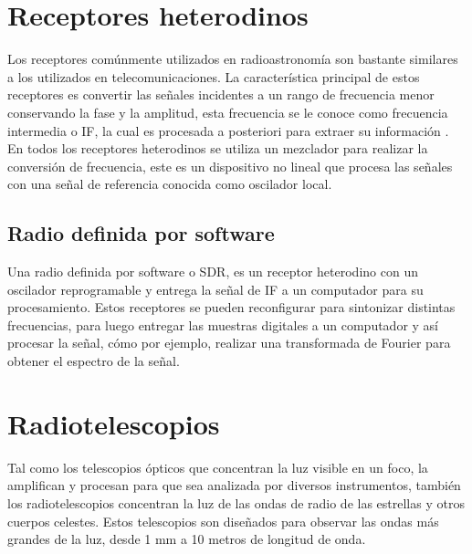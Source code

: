 \section{Receptores heterodinos}

Los receptores comúnmente utilizados en radioastronomía son bastante similares a los utilizados en telecomunicaciones. La característica principal de estos receptores es convertir las señales incidentes a un rango de frecuencia menor conservando la fase y la amplitud, esta frecuencia se le conoce como frecuencia intermedia o IF, la cual es procesada a posteriori para extraer su información \cite{Finger2013}.\\

En todos los receptores heterodinos se utiliza un mezclador para realizar la conversión de frecuencia, este es un dispositivo no lineal que procesa las señales con una señal de referencia conocida como oscilador local.\\


\subsection{Radio definida por software}

Una radio definida por software o SDR, es un receptor heterodino con un oscilador reprogramable y entrega la señal de IF a un computador para su procesamiento. Estos receptores se pueden reconfigurar para sintonizar distintas frecuencias, para luego entregar las muestras digitales a un computador y así procesar la señal, cómo por ejemplo, realizar una transformada de Fourier para obtener el espectro de la señal.\\





\section{Radiotelescopios}

Tal como los telescopios ópticos que concentran la luz visible en un foco, la amplifican y procesan para que sea analizada por diversos instrumentos, también los radiotelescopios concentran la luz de las ondas de radio de las estrellas y otros cuerpos celestes. Estos telescopios son diseñados para observar las ondas más grandes de la luz, desde 1 mm a 10 metros de longitud de onda. \cite{nraoRadioTelescopes}\\

